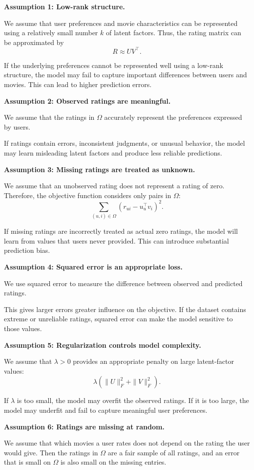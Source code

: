 \textbf{Assumption 1: Low-rank structure.}

We assume that user preferences and movie characteristics
can be represented using a relatively small number $k$ of
latent factors. Thus, the rating matrix can be approximated by
\[
R \approx UV^\top.
\]

If the underlying preferences cannot be represented well
using a low-rank structure, the model may fail to capture
important differences between users and movies. This can
lead to higher prediction errors.

\textbf{Assumption 2: Observed ratings are meaningful.}

We assume that the ratings in $\Omega$ accurately represent
the preferences expressed by users.

If ratings contain errors, inconsistent judgments, or
unusual behavior, the model may learn misleading latent
factors and produce less reliable predictions.

\textbf{Assumption 3: Missing ratings are treated as unknown.}

We assume that an unobserved rating does not represent a
rating of zero. Therefore, the objective function considers
only pairs in $\Omega$:
\[
\sum_{(u,i)\in\Omega}
(r_{ui}-u_u^\top v_i)^2.
\]

If missing ratings are incorrectly treated as actual zero
ratings, the model will learn from values that users never
provided. This can introduce substantial prediction bias.

\textbf{Assumption 4: Squared error is an appropriate loss.}

We use squared error to measure the difference between
observed and predicted ratings.

This gives larger errors greater influence on the objective.
If the dataset contains extreme or unreliable ratings,
squared error can make the model sensitive to those values.

\textbf{Assumption 5: Regularization controls model complexity.}

We assume that $\lambda>0$ provides an appropriate penalty
on large latent-factor values:
\[
\lambda(\|U\|_F^2+\|V\|_F^2).
\]

If $\lambda$ is too small, the model may overfit the observed
ratings. If it is too large, the model may underfit and fail
to capture meaningful user preferences.

\textbf{Assumption 6: Ratings are missing at random.}

We assume that which movies a user rates does not depend on the
rating the user would give. Then the ratings in $\Omega$ are a
fair sample of all ratings, and an error that is small on
$\Omega$ is also small on the missing entries.

